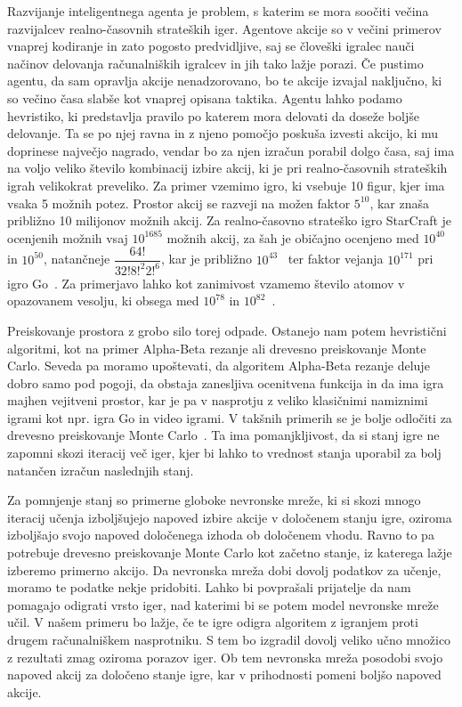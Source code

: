 \documentclass[a4paper, 12pt]{book}
\begin{document}
Razvijanje inteligentnega agenta je problem, s katerim se mora soočiti večina razvijalcev realno-časovnih strateških iger. 
Agentove akcije so v večini primerov vnaprej kodiranje in zato pogosto predvidljive, saj se človeški igralec nauči načinov delovanja računalniških igralcev in jih tako lažje porazi.
Če pustimo agentu, da sam opravlja akcije nenadzorovano, bo te akcije izvajal naključno, ki so večino časa slabše kot vnaprej opisana taktika.
Agentu lahko podamo hevristiko, ki predstavlja pravilo po katerem mora delovati da doseže boljše delovanje.
Ta se po njej ravna in z njeno pomočjo poskuša izvesti akcijo, ki mu doprinese največjo nagrado, vendar bo za njen izračun porabil dolgo časa, saj ima na voljo veliko število kombinacij izbire akcij, ki je pri realno-časovnih strateških igrah velikokrat preveliko.
Za primer vzemimo igro, ki vsebuje 10 figur, kjer ima vsaka 5 možnih potez.
Prostor akcij se razveji na možen faktor $5^{10}$, kar znaša približno 10 milijonov možnih akcij.
Za realno-časovno strateško igro StarCraft je ocenjenih možnih vsaj $10^{1685}$ možnih akcij, za šah je običajno ocenjeno med $10^{40}$ in $10^{50}$, natančneje $\dfrac{64!}{32!8!^{2}2!^{6}}$, kar je približno $10^{43}$~\cite{wiki:Shannon_number} ter faktor vejanja $10^{171}$ pri igro Go~\cite{ontanon2017combinatorial}.
Za primerjavo lahko kot zanimivost vzamemo število atomov v opazovanem vesolju, ki obsega med $10^{78}$ in $10^{82}$~\cite{atoms}.

Preiskovanje prostora z grobo silo torej odpade. 
Ostanejo nam potem hevristični algoritmi, kot na primer Alpha-Beta rezanje ali drevesno preiskovanje Monte Carlo. 
Seveda pa moramo upoštevati, da algoritem Alpha-Beta rezanje deluje dobro samo pod pogoji, da obstaja zanesljiva ocenitvena funkcija in da ima igra majhen vejitveni prostor, kar je pa v nasprotju z veliko klasičnimi namiznimi igrami kot npr. igra Go in video igrami. 
V takšnih primerih se je bolje odločiti za drevesno preiskovanje Monte Carlo~\cite{chaslot2008monte}.
Ta ima pomanjkljivost, da si stanj igre ne zapomni skozi iteracij več iger, kjer bi lahko to vrednost stanja uporabil za bolj natančen izračun naslednjih stanj.

Za pomnjenje stanj so primerne globoke nevronske mreže, ki si skozi mnogo iteracij učenja izboljšujejo napoved izbire akcije v določenem stanju igre, oziroma izboljšajo svojo napoved določenega izhoda ob določenem vhodu.
Ravno to pa potrebuje drevesno preiskovanje Monte Carlo kot začetno stanje, iz katerega lažje izberemo primerno akcijo.
Da nevronska mreža dobi dovolj podatkov za učenje, moramo te podatke nekje pridobiti.
Lahko bi povprašali prijatelje da nam pomagajo odigrati vrsto iger, nad katerimi bi se potem model nevronske mreže učil.
V našem primeru bo lažje, če te igre odigra algoritem z igranjem proti drugem računalniškem nasprotniku.
S tem bo izgradil dovolj veliko učno množico z rezultati zmag oziroma porazov iger. 
Ob tem nevronska mreža posodobi svojo napoved akcij za določeno stanje igre, kar v prihodnosti pomeni boljšo napoved akcije.
\end{document}
